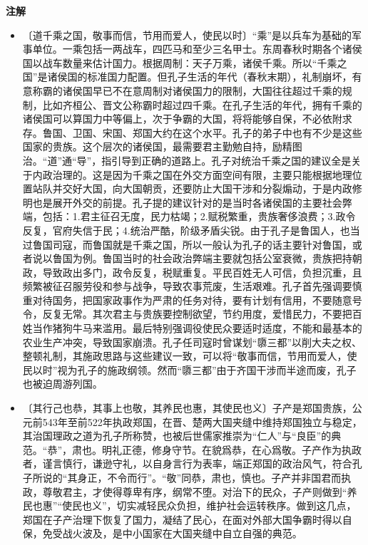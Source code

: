 \documentclass[12pt,UTF-8,openany,a4]{ctexbook}
\begin{document}
\newpage

\begin{Large}
    \noindent\textbf{注解}
\end{Large}


\vspace{-1em}

\begin{itemize}
    \setlength\itemsep{-0.2em}
    \item〔道千乘之国，敬事而信，节用而爱人，使民以时〕{\yiwen “乘”是以兵车为基础的军事单位。一乘包括一两战车，四匹马和至少三名甲士。东周春秋时期各个诸侯国以战车数量来估计国力。根据周制：天子万乘，诸侯千乘。所以“千乘之国”是诸侯国的标准国力配置。但孔子生活的年代（春秋末期），礼制崩坏，有意称霸的诸侯国早已不在意周制对诸侯国力的限制，大国往往超过千乘的规制，比如齐桓公、晋文公称霸时超过四千乘。在孔子生活的年代，拥有千乘的诸侯国可以算国力中等偏上，次于争霸的大国，将将能够自保，不必依附求存。鲁国、卫国、宋国、郑国大约在这个水平。孔子的弟子中也有不少是这些国家的贵族。这个层次的诸侯国，最需要君主勤勉自持，励精图治。“道”通“导”，指引导到正确的道路上。孔子对统治千乘之国的建议全是关于内政治理的。这是因为千乘之国在外交方面空间有限，主要只能根据地理位置站队并交好大国，向大国朝贡，还要防止大国干涉和分裂煽动，于是内政修明也是展开外交的前提。孔子提的建议针对的是当时各诸侯国的主要社会弊端，包括：1.君主征召无度，民力枯竭；2.赋税繁重，贵族奢侈浪费；3.政令反复，官府失信于民；4.统治严酷，阶级矛盾尖锐。由于孔子是鲁国人，也当过鲁国司寇，而鲁国就是千乘之国，所以一般认为孔子的话主要针对鲁国，或者说以鲁国为例。鲁国当时的社会政治弊端主要就包括公室衰微，贵族把持朝政，导致政出多门，政令反复，税赋重复。平民百姓无人可信，负担沉重，且频繁被征召服劳役和参与战争，导致农事荒废，生活艰难。孔子首先强调要慎重对待国务，把国家政事作为严肃的任务对待，要有计划有信用，不要随意号令，反复无常。其次君主与贵族要控制欲望，节约用度，爱惜民力，不要把百姓当作猪狗牛马来滥用。最后特别强调役使民众要适时适度，不能和最基本的农业生产冲突，导致国家崩溃。孔子任司寇时曾谋划“隳三都”以削大夫之权、整顿礼制，其施政思路与这些建议一致，可以将“敬事而信，节用而爱人，使民以时”视为孔子的施政纲领。然而“隳三都”由于齐国干涉而半途而废，孔子也被迫周游列国。}
    \item〔其行己也恭，其事上也敬，其养民也惠，其使民也义〕{\yiwen 子产是郑国贵族，公元前543年至前522年执政郑国，在晋、楚两大国夹缝中维持郑国独立与稳定，其治国理政之道为孔子所称赞，也被后世儒家推崇为“仁人”与“良臣”的典范。“恭”，肃也。明礼正德，修身守节。在貌爲恭，在心爲敬。子产作为执政者，谨言慎行，谦逊守礼，以自身言行为表率，端正郑国的政治风气，符合孔子所说的“其身正，不令而行”。“敬”同恭，肃也，慎也。子产并非国君而执政，尊敬君主，才使得尊卑有序，纲常不堕。对治下的民众，子产则做到“养民也惠”“使民也义”，切实减轻民众负担，维护社会运转秩序。做到这几点，郑国在子产治理下恢复了国力，凝结了民心，在面对外部大国争霸时得以自保，免受战火波及，是中小国家在大国夹缝中自立自强的典范。}

\end{itemize}
\end{document}
